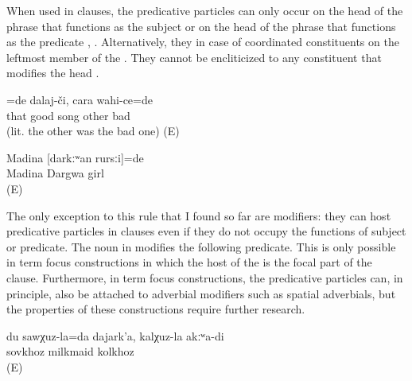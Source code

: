 When used in  clauses, the predicative particles can only occur on the head of the phrase that functions as the subject  or on the head of the phrase that functions as the  predicate , . Alternatively, they in case of coordinated constituents on the leftmost member of the  . They cannot be encliticized to any constituent that modifies the head . 
%
\begin{exe}
	\ex	\label{ex:‎The good one was a singer, not the bad one}
	\gll	[it	ʡaˁħ-ce]=de	dalaj-či,	cara	wahi-ce=de\\
		that	good	song	other	bad\\
	\glt	{} (lit. the other was the bad one) (E)

	\ex	\label{ex:‎‎‎Madina was a Dargwa girl}
	\begin{xlist}
		\ex	\label{ex:‎‎‎Madina was a Dargwa girl@A}
		\gll	Madina	[darkːʷan	rursːi]=de\\
			Madina	Dargwa	girl\\
		\glt	{} (E)

		 \label{ex:‎‎‎Madina was a Dargwa girl@B}
	\end{xlist}
\end{exe}

The only exception to this rule that I found so far are  modifiers: they can host predicative particles in  clauses even if they do not occupy the functions of  subject or  predicate. The  noun in  modifies the following  predicate. This is only possible in term focus constructions in which the host of the  is the focal part of the clause. Furthermore, in term focus constructions, the predicative particles can, in principle, also be attached to adverbial modifiers such as spatial adverbials, but the properties of these constructions require further research.
%
\begin{exe}
	\ex	\label{ex:‎I am milkmaid of the SOVKHOZ, not of the kolkhoz}
	\gll	du	sawχuz-la=da	dajark'a,	kalχuz-la	akːʷa-di\\
			sovkhoz	milkmaid	kolkhoz	\\
	\glt	{} (E)
\end{exe}

